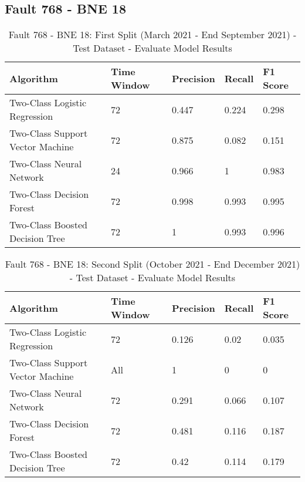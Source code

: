 \subsection{Fault 768 - BNE 18}

\begin{table}[!ht]
    \centering
    \begin{tabular}{|l|l|l|l|l|}
    \hline
        Algorithm & Time Window & Precision & Recall & F1 Score \\ \hline
        Two-Class Logistic Regression & 72 & 0.447 & 0.224 & 0.298 \\ \hline
        Two-Class Support Vector Machine & 72 & 0.875 & 0.082 & 0.151 \\ \hline
        Two-Class Neural Network & 24 & 0.966 & 1 & 0.983 \\ \hline
        Two-Class Decision Forest & 72 & 0.998 & 0.993 & 0.995 \\ \hline
        Two-Class Boosted Decision Tree & 72 & 1 & 0.993 & 0.996 \\ \hline
    \end{tabular}
    \caption{Fault 768 - BNE 18: First Split (March 2021 - End September 2021) - Test Dataset - Evaluate Model Results}
    \label{9112_SCA34_1st}
\end{table}

\begin{table}[!ht]
    \centering
    \begin{tabular}{|l|l|l|l|l|}
    \hline
        Algorithm & Time Window & Precision & Recall & F1 Score \\ \hline
        Two-Class Logistic Regression & 72 & 0.126 & 0.02 & 0.035 \\ \hline
        Two-Class Support Vector Machine & All & 1 & 0 & 0 \\ \hline
        Two-Class Neural Network & 72 & 0.291 & 0.066 & 0.107 \\ \hline
        Two-Class Decision Forest & 72 & 0.481 & 0.116 & 0.187 \\ \hline
        Two-Class Boosted Decision Tree & 72 & 0.42 & 0.114 & 0.179 \\ \hline
    \end{tabular}
    \caption{Fault 768 - BNE 18: Second Split (October 2021 - End December 2021) - Test Dataset - Evaluate Model Results}
    \label{9112_SCA34_1st}
\end{table}

